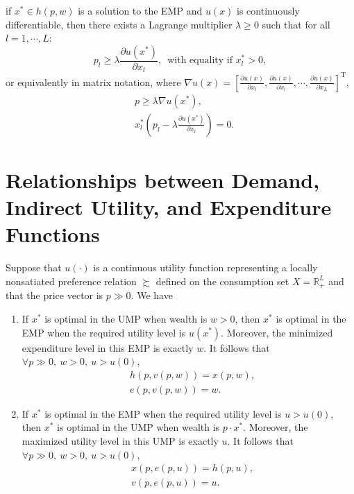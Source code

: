 \documentclass[12pt,fleqn]{book} %
\begin{document}
\begin{theorem}
	if $x^* \in h(p,w)$ is a solution to the EMP and $u(x)$ is continuously differentiable, then there exists a
	Lagrange multiplier $\lambda\ge0$ such that for all $l = 1,\cdots, L$:
	\[
	p_l\ge\lambda\frac{\partial u(x^*)}{\partial x_l}  ,\ \;\text{with equality if } x^*_l > 0,
	\]
	or equivalently in matrix notation, where $\nabla u(x)= \left[\frac{\partial u(x)}{\partial x_l},\frac{\partial u(x)}{\partial x_l},\cdots,\frac{\partial u(x)}{\partial x_L} \right]^\mathrm{T}$,
	\begin{align*}
	& p\ge\lambda\nabla u(x^*) , \\
	&x^*_l\left(p_l-\lambda\frac{\partial u(x^*)}{\partial x_l} \right)= 0.
	\end{align*}
\end{theorem}



\section{Relationships between Demand, Indirect Utility,
	and Expenditure Functions}
\begin{proposition}
	Suppose that $u(\cdot)$ is a continuous utility function representing a locally nonsatiated preference relation $\succsim$ defined on the consumption set $X=\mathbb{R}_+^L$ and that the price vector is $p \gg 0$. We have
	\begin{enumerate}
		\item  If $x^*$ is optimal in the UMP when wealth is $w > 0$, then $x^*$ is optimal in the
		EMP when the required utility level is $u(x^*)$. Moreover, the minimized	expenditure level in this EMP is exactly $w$. It follows that $\forall p\gg0,\ w>0,\ u>u(0)$,
		\begin{align*}
			&h(p,v(p,w))=x(p,w),\\
			&e(p,v(p,w))=w.
		\end{align*}
		
		\item If $x^*$ is optimal in the EMP when the required utility level is $u > u(0)$, then $x^*$ is optimal in the UMP when wealth is $p\cdot x^*$. Moreover, the maximized utility level in this UMP is exactly $u$. It follows that $\forall p\gg0,\ w>0,\ u>u(0)$,
		\begin{align*}
		&x(p,e(p,u))=h(p,u),\\
		&v(p,e(p,u))=u.
		\end{align*}
	\end{enumerate}

	
\end{proposition}
\end{document}
